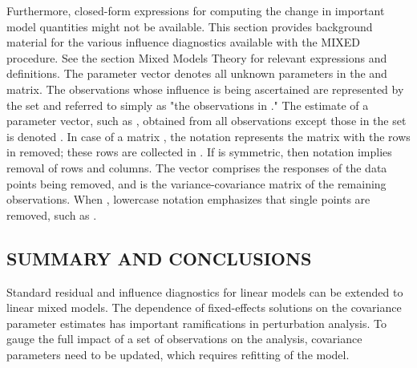 \documentclass[Main.tex]{subfiles}
\begin{document}
Furthermore, closed-form expressions for computing the change in important model quantities might not be available.
This section provides background material for the various influence diagnostics available with the MIXED procedure. See the section Mixed Models Theory for relevant expressions and definitions. The parameter vector  denotes all unknown parameters in the  and  matrix.
The observations whose influence is being ascertained are represented by the set  and referred to simply as "the observations in ." The estimate of a parameter vector, such as , obtained from all observations except those in the set  is denoted . In case of a matrix , the notation  represents the matrix with the rows in  removed; these rows are collected in . If  is symmetric, then notation  implies removal of rows and columns. The vector  comprises the responses of the data points being removed, and  is the variance-covariance matrix of the remaining observations. When , lowercase notation emphasizes that single points are removed, such as .

\newpage


\subsection*{SUMMARY AND CONCLUSIONS}
Standard residual and influence diagnostics for linear models can be extended to linear mixed models. The
dependence of fixed-effects solutions on the covariance parameter estimates has important ramifications
in perturbation analysis. To gauge the full impact of a set of observations on the analysis, covariance
parameters need to be updated, which requires refitting of the model. 
\end{document}
